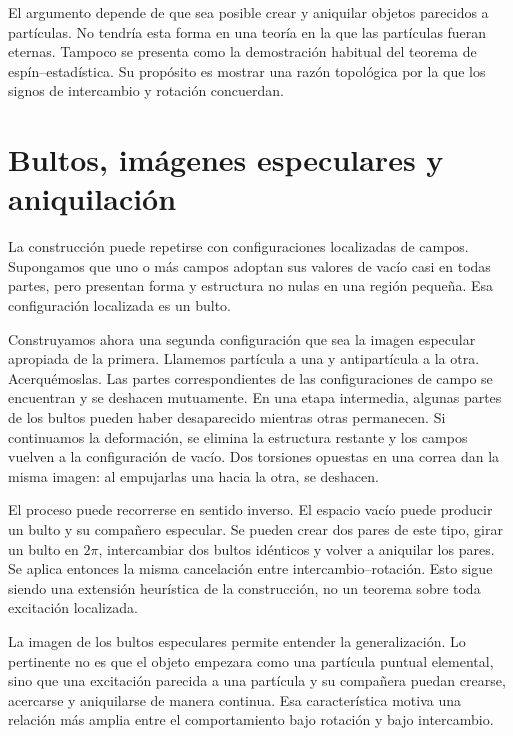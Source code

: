 El argumento depende de que sea posible crear y aniquilar objetos parecidos a partículas. No tendría esta forma en una teoría en la que las partículas fueran eternas. Tampoco se presenta como la demostración habitual del teorema de espín--estadística. Su propósito es mostrar una razón topológica por la que los signos de intercambio y rotación concuerdan.

\section{Bultos, imágenes especulares y aniquilación}

La construcción puede repetirse con configuraciones localizadas de campos. Supongamos que uno o más campos adoptan sus valores de vacío casi en todas partes, pero presentan forma y estructura no nulas en una región pequeña. Esa configuración localizada es un bulto.

Construyamos ahora una segunda configuración que sea la imagen especular apropiada de la primera. Llamemos partícula a una y antipartícula a la otra. Acerquémoslas. Las partes correspondientes de las configuraciones de campo se encuentran y se deshacen mutuamente. En una etapa intermedia, algunas partes de los bultos pueden haber desaparecido mientras otras permanecen. Si continuamos la deformación, se elimina la estructura restante y los campos vuelven a la configuración de vacío. Dos torsiones opuestas en una correa dan la misma imagen: al empujarlas una hacia la otra, se deshacen.

El proceso puede recorrerse en sentido inverso. El espacio vacío puede producir un bulto y su compañero especular. Se pueden crear dos pares de este tipo, girar un bulto en \(2\pi\), intercambiar dos bultos idénticos y volver a aniquilar los pares. Se aplica entonces la misma cancelación entre intercambio--rotación. Esto sigue siendo una extensión heurística de la construcción, no un teorema sobre toda excitación localizada.

\begin{classroomqa}
\end{classroomqa}

La imagen de los bultos especulares permite entender la generalización. Lo pertinente no es que el objeto empezara como una partícula puntual elemental, sino que una excitación parecida a una partícula y su compañera puedan crearse, acercarse y aniquilarse de manera continua. Esa característica motiva una relación más amplia entre el comportamiento bajo rotación y bajo intercambio.


